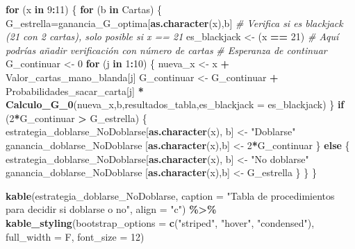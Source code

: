 \documentclass[12pt,a4paper,]{book}
\newenvironment{Shaded}{\begin{snugshade}}{\end{snugshade}}
\newcommand{\AttributeTok}[1]{\textcolor[rgb]{0.13,0.29,0.53}{#1}}
\newcommand{\CommentTok}[1]{\textcolor[rgb]{0.56,0.35,0.01}{\textit{#1}}}
\newcommand{\ControlFlowTok}[1]{\textcolor[rgb]{0.13,0.29,0.53}{\textbf{#1}}}
\newcommand{\DecValTok}[1]{\textcolor[rgb]{0.00,0.00,0.81}{#1}}
\newcommand{\FunctionTok}[1]{\textcolor[rgb]{0.13,0.29,0.53}{\textbf{#1}}}
\newcommand{\NormalTok}[1]{#1}
\newcommand{\OtherTok}[1]{\textcolor[rgb]{0.56,0.35,0.01}{#1}}
\newcommand{\SpecialCharTok}[1]{\textcolor[rgb]{0.81,0.36,0.00}{\textbf{#1}}}
\newcommand{\StringTok}[1]{\textcolor[rgb]{0.31,0.60,0.02}{#1}}
\numberwithin{dummy}{section}
\theoremstyle{ocrenumbox}
\theoremstyle{blacknumex}
\theoremstyle{blacknumbox}
\theoremstyle{ocrenum}
\theoremstyle{ocrenum}
\begin{document}
\begin{Shaded}
\begin{Highlighting}[]
\ControlFlowTok{for}\NormalTok{ (x }\ControlFlowTok{in} \DecValTok{9}\SpecialCharTok{:}\DecValTok{11}\NormalTok{) \{}
  \ControlFlowTok{for}\NormalTok{ (b }\ControlFlowTok{in}\NormalTok{ Cartas) \{}
\NormalTok{    G\_estrella}\OtherTok{=}\NormalTok{ganancia\_G\_optima[}\FunctionTok{as.character}\NormalTok{(x),b]}
    \CommentTok{\# Verifica si es blackjack (21 con 2 cartas), solo posible si x == 21}
\NormalTok{    es\_blackjack }\OtherTok{\textless{}{-}}\NormalTok{ (x }\SpecialCharTok{==} \DecValTok{21}\NormalTok{)  }\CommentTok{\# Aquí podrías añadir verificación con número de cartas}
    \CommentTok{\# Esperanza de continuar}
\NormalTok{    G\_continuar }\OtherTok{\textless{}{-}} \DecValTok{0}
    \ControlFlowTok{for}\NormalTok{ (j }\ControlFlowTok{in} \DecValTok{1}\SpecialCharTok{:}\DecValTok{10}\NormalTok{) \{}
\NormalTok{      nueva\_x }\OtherTok{\textless{}{-}}\NormalTok{ x }\SpecialCharTok{+}\NormalTok{ Valor\_cartas\_mano\_blanda[j]}
\NormalTok{      G\_continuar }\OtherTok{\textless{}{-}}\NormalTok{ G\_continuar }\SpecialCharTok{+}\NormalTok{ Probabilidades\_sacar\_carta[j] }\SpecialCharTok{*} \FunctionTok{Calculo\_G\_0}\NormalTok{(nueva\_x,b,resultados\_tabla,}\AttributeTok{es\_blackjack =}\NormalTok{ es\_blackjack) }
\NormalTok{    \}}
    \ControlFlowTok{if}\NormalTok{ (}\DecValTok{2}\SpecialCharTok{*}\NormalTok{G\_continuar }\SpecialCharTok{\textgreater{}}\NormalTok{ G\_estrella) \{}
\NormalTok{      estrategia\_doblarse\_NoDoblarse[}\FunctionTok{as.character}\NormalTok{(x), b] }\OtherTok{\textless{}{-}} \StringTok{"Doblarse"}
\NormalTok{      ganancia\_doblarse\_NoDoblarse [}\FunctionTok{as.character}\NormalTok{(x),b] }\OtherTok{\textless{}{-}} \DecValTok{2}\SpecialCharTok{*}\NormalTok{G\_continuar}
\NormalTok{    \} }\ControlFlowTok{else}\NormalTok{ \{}
\NormalTok{      estrategia\_doblarse\_NoDoblarse[}\FunctionTok{as.character}\NormalTok{(x), b] }\OtherTok{\textless{}{-}} \StringTok{"No doblarse"}
\NormalTok{      ganancia\_doblarse\_NoDoblarse [}\FunctionTok{as.character}\NormalTok{(x),b] }\OtherTok{\textless{}{-}}\NormalTok{ G\_estrella}
\NormalTok{    \}}
\NormalTok{  \}}
\NormalTok{\}}

\FunctionTok{kable}\NormalTok{(estrategia\_doblarse\_NoDoblarse, }
      \AttributeTok{caption =} \StringTok{"Tabla de procedimientos para decidir si doblarse o no"}\NormalTok{,}
      \AttributeTok{align =} \StringTok{"c"}\NormalTok{) }\SpecialCharTok{\%\textgreater{}\%}
  \FunctionTok{kable\_styling}\NormalTok{(}\AttributeTok{bootstrap\_options =} \FunctionTok{c}\NormalTok{(}\StringTok{"striped"}\NormalTok{, }\StringTok{"hover"}\NormalTok{, }\StringTok{"condensed"}\NormalTok{),}
                \AttributeTok{full\_width =}\NormalTok{ F, }\AttributeTok{font\_size =} \DecValTok{12}\NormalTok{)}


\end{Highlighting}
\end{Shaded}
\end{document}
